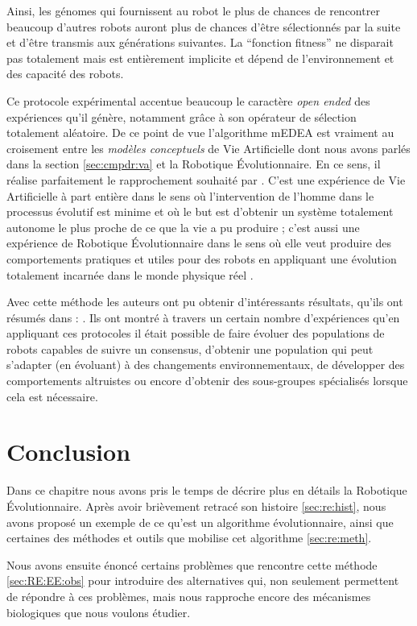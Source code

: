 Ainsi, les génomes qui fournissent au robot le plus de chances de rencontrer beaucoup d'autres robots auront plus de chances d'être sélectionnés par la suite et d'être transmis aux générations suivantes. La ``fonction fitness'' ne disparait pas totalement mais est entièrement implicite et dépend de l'environnement et des capacité des robots.

Ce protocole expérimental accentue beaucoup le caractère \emph{open ended} des expériences qu'il génère, notamment grâce à son opérateur de sélection totalement aléatoire. De ce point de vue l'algorithme mEDEA est vraiment au croisement entre les \emph{modèles conceptuels} de Vie Artificielle dont nous avons parlés dans la section \ref{sec:cmpdr:va} et la Robotique \'Evolutionnaire. En ce sens, il réalise parfaitement le rapprochement souhaité par \cite{watson02embodiedevolutiondistributingevolutionaryalgorithmpopulationrobots}. C'est une expérience de Vie Artificielle à part entière dans le sens où l'intervention de l'homme dans le processus évolutif est minime et où le but est d'obtenir un système totalement autonome le plus proche de ce que la vie a pu produire ;  c'est aussi une expérience de Robotique \'Evolutionnaire dans le sens où elle veut produire des comportements pratiques et utiles pour des robots en appliquant une évolution totalement incarnée dans le monde physique réel .

Avec cette méthode les auteurs ont pu obtenir d'intéressants résultats, qu'ils ont résumés dans : \cite{bredeche2012environmentdrivenopenende}. Ils ont montré à travers un certain nombre d'expériences qu'en appliquant ces protocoles il était possible de faire évoluer des populations de robots capables de suivre un consensus, d'obtenir une population qui peut s'adapter (en évoluant) à des changements environnementaux, de développer des comportements altruistes ou encore d'obtenir des sous-groupes spécialisés lorsque cela est nécessaire.


\section{Conclusion}
Dans ce chapitre nous avons pris le temps de décrire plus en détails la Robotique \'Evolutionnaire. Après avoir brièvement retracé son histoire \ref{sec:re:hist}, nous avons proposé un exemple de ce qu'est un algorithme évolutionnaire, ainsi que certaines des méthodes et outils que mobilise cet algorithme \ref{sec:re:meth}. 


Nous avons ensuite énoncé certains problèmes que rencontre cette méthode \ref{sec:RE:EE:obs} pour introduire des alternatives qui, non seulement permettent de répondre à ces problèmes, mais nous rapproche encore des mécanismes biologiques que nous voulons étudier.

